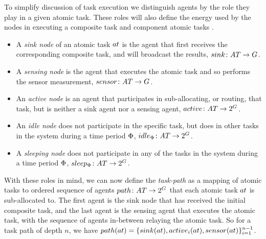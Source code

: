 To simplify discussion of task execution we distinguish agents by the role they play in a given atomic task. These roles will also define the energy used by the nodes in executing a composite task and component atomic tasks \citep{Gupta2014}.
\begin{itemize}
	\item A \textit{sink node} of an atomic task $\varAtomicTask{}{}$ is the agent that first receives the corresponding composite task, and will broadcast the results, $\formalSinkRole{}{}$.
	\item A \textit{sensing node} is the agent that executes the atomic task and so performs the sensor measurement, $\formalSenseRole{}{}$.
	\item An \textit{active node} is an agent that participates in sub-allocating, or routing, that task, but is neither a sink agent nor a sensing agent, $\formalActiveRole{}{}$.
	\item An \textit{idle node} does not participate in the specific task, but does in other tasks in the system during a time period $\Phi$, $\formalIdleRole{}{}$.
	\item A \textit{sleeping node} does not participate in any of the tasks in the system during a time period $\Phi$, $\formalSleepRole{}{}$.
\end{itemize}
With these roles in mind, we can now define the  \textit{task-path} as a mapping of atomic tasks to ordered sequence of agents $\formalTaskArc{}{}$ that each atomic task $\varAtomicTask{}{}$ is sub-allocated to. The first agent is the sink node that has received the initial composite task, and the last agent is the sensing agent that executes the atomic task, with the sequence of agents in-between relaying the atomic task. So for a task path of depth $n$, we have
$\functionTaskArc{}{} = \lbrace \functionSinkRole{}{}, \functionActiveRole{i}{}, \functionSenseRole{}{} \rbrace_{i=1}^{n-1}$. 
